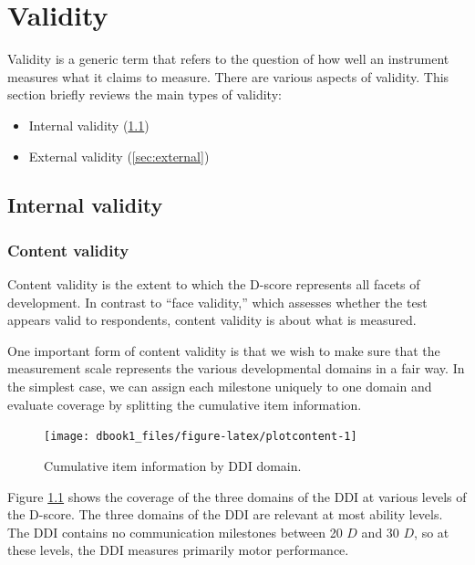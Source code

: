 \documentclass[
]{book}
\providecommand{\tightlist}{%
  \setlength{\itemsep}{0pt}\setlength{\parskip}{0pt}}
\begin{document}
\hypertarget{ch:validity}{%
\chapter{Validity}\label{ch:validity}}

Validity is a generic term that refers to the question of how well an instrument measures what it claims to measure. There are various aspects of validity. This section briefly reviews the main types of validity:

\begin{itemize}
\tightlist
\item
  Internal validity (\ref{sec:internal})
\item
  External validity (\ref{sec:external})
\end{itemize}

\hypertarget{sec:internal}{%
\section{Internal validity}\label{sec:internal}}

\hypertarget{content-validity}{%
\subsection{Content validity}\label{content-validity}}

Content validity is the extent to which the D-score represents all facets of development. In contrast to ``face validity,'' which assesses whether the test appears valid to respondents, content validity is about what is measured.

One important form of content validity is that we wish to make sure that the measurement scale represents the various developmental domains in a fair way. In the simplest case, we can assign each milestone uniquely to one domain and evaluate coverage by splitting the cumulative item information.

\begin{figure}

{\centering \texttt{[image: dbook1\_files/figure-latex/plotcontent-1]} 

}

\caption{Cumulative item information by DDI domain.}\label{fig:plotcontent}
\end{figure}



Figure \ref{fig:plotcontent} shows the coverage of the three domains of the DDI at various levels of the D-score. The three domains of the DDI are relevant at most ability levels. The DDI contains no communication milestones between 20 \(D\) and 30 \(D\), so at these levels, the DDI measures primarily motor performance.
\end{document}
